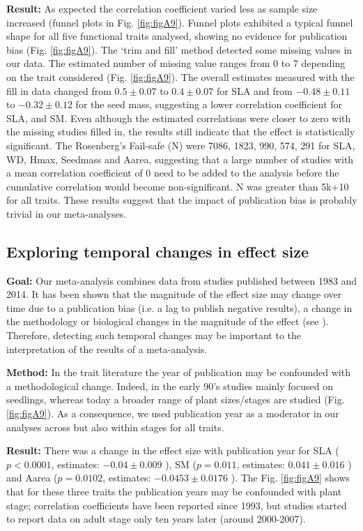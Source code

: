 \documentclass[a4paper,11pt]{article}
\begin{document}
\begin{appendices}
\textbf{Result:} As expected the correlation coefficient varied less as sample size increased (funnel plots in Fig. \ref{fig:figA9}). Funnel plots exhibited a typical funnel shape for all five functional traits analysed, showing no evidence for publication bias (Fig. \ref{fig:figA9}).
The ‘trim and fill’ method detected some missing values in our data. The estimated number of missing value ranges from 0 to 7 depending on the trait considered (Fig. \ref{fig:figA9}). The overall estimates measured with the fill in data changed from $0.5 \pm 0.07$  to $0.4 \pm 0.07$ for SLA and from $-0.48 \pm 0.11$ to $-0.32 \pm 0.12$ for the seed mass, suggesting a lower correlation coefficient for SLA, and SM. Even although the estimated correlations were closer to zero with the missing studies filled in, the results still indicate that the effect is statistically significant.
The Rosenberg’s Fail-safe (N) were 7086, 1823, 990, 574, 291 for SLA, WD, Hmax, Seedmass and Aarea, suggesting that a large number of studies with a mean correlation coefficient of 0 need to be added to the analysis before the cumulative correlation would become non-significant. N was greater than 5k+10 for all traits.
These results suggest that the impact of publication bias is probably trivial in our meta-analyses.

\subsection{Exploring temporal changes in effect size}
\textbf{Goal:} Our meta-analysis combines data from studies published between 1983 and 2014. It has been shown that the magnitude of the effect size may change over time due to a publication bias (i.e. a lag to publish negative results), a change in the methodology or biological changes in the magnitude of the effect (see \citealt{Koricheva:2013hy}). Therefore, detecting such temporal changes may be important to the interpretation of the results of a meta-analysis.

\textbf{Method:} In the trait literature the year of publication may be confounded with a methodological change. Indeed, in the early 90’s studies mainly focused on seedlings, whereas today a broader range of plant sizes/stages are studied (Fig. \ref{fig:figA9}). As a consequence, we used publication year as a moderator in our analyses \citep{Zvereva:2008jm} across but also within stages for all traits.  

\textbf{Result:} There was a change in the effect size with publication year for SLA ($p<0.0001$, estimates: $-0.04 \pm 0.009$ ), SM ($p = 0.011$, estimates: $0.041 \pm 0.016$ ) and Aarea ($p = 0.0102$, estimates: $-0.0453 \pm 0.0176$ ). The Fig. \ref{fig:figA9} shows that for these three traits the publication years may be confounded with plant stage; correlation coefficients have been reported since 1993, but studies started to report data on adult stage only ten years later (around 2000-2007).


\end{appendices}
\end{document}
